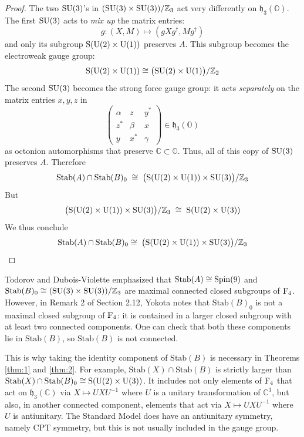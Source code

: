 \documentclass{article}
\theoremstyle{plain}
\theoremstyle{remark}
\theoremstyle{definition}
\newcommand{\maps}{\colon}    %
\newcommand{\C}{{\mathbb C}}  %
\newcommand{\Z}{{\mathbb Z}}  %
\renewcommand{\O}{{\mathbb O}}  %
\newcommand{\U}{{\rm U}}    %
\newcommand{\SU}{{\rm SU}}    %
\newcommand{\Spin}{{\rm Spin}}    %
\newcommand{\F}{{\rm F}}       %
\newcommand{\Stab}{\mathrm{Stab}} %
\renewcommand{\S}{\mathrm{S}} %
\newcommand{\h}{\mathfrak{h}}  %
\begin{document}
\begin{proof}
The two $\SU(3)$'s in  $(\SU(3) \times \SU(3))/\Z_3$ act very differently on $\h_3(\O)$.  The first $\SU(3)$ acts to \emph{mix up} the matrix entries:
\[    g \maps (X,M) \mapsto (gXg^\dagger, Mg^\dagger ) \]
and only its subgroup $\S(\U(2) \times \U(1))$ preserves $A$.  This subgroup becomes the electroweak gauge group:
\[   \S(\U(2) \times \U(1)) \cong \big(\SU(2) \times \U(1)\big)/\Z_2 \]
The second $\SU(3)$ becomes the strong force gauge group: it acts \emph{separately} on the matrix entries $x,y,z$ in  
\[    \left( \begin{array}{ccc}  
                         \alpha  &  z  & y^*    \\  
                         z^*       & \beta & x      \\ 
                         y       & x^*   & \gamma   
\end{array} \right) \in \h_3(\O) 
\]
as octonion automorphisms that preserve $\C \subset \O$.  Thus, all of this copy of $\SU(3)$ preserves $A$.  Therefore
\[   \Stab(A) \cap \Stab(B)_0  \; \cong \; \big(\S(\U(2) \times \U(1)) \times \SU(3)\big) /\Z_3  \]
But
\[     
  \big(\S(\U(2) \times \U(1)) \times \SU(3)\big) /\Z_3  \;\cong\; \S(\U(2) \times \U(3))  
\]
We thus conclude
\[   \Stab(A) \cap \Stab(B)_0 \cong \; \big(\S(\U(2) \times \U(1)) \times \SU(3)\big) /\Z_3   \qedhere \]
\end{proof}

Todorov and Dubois-Violette \cite{TDV} emphasized that $\Stab(A) \cong \Spin(9)$ and $\Stab(B)_0 \cong (\SU(3) \times \SU(3))/\Z_3$ are maximal connected closed subgroups of $\F_4$.  However, in Remark 2 of Section 2.12, Yokota \cite{Yokota} notes that $\Stab(B)_0$ is not a maximal closed subgroup of $\F_4$: it is contained in a larger closed subgroup with at least two connected components.  One can check that both these components lie in $\Stab(B)$, so $\Stab(B)$ is not connected.

This is why taking the identity component of $\Stab(B)$ is necessary in Theorems \ref{thm:1} and \ref{thm:2}.  For example, $\Stab(X) \cap \Stab(B)$ is strictly larger than $\Stab(X) \cap \Stab(B)_0 \cong \S(\U(2) \times \U(3))$.  It includes not only elements of $\F_4$ that act on $\h_3(\C)$ via $X \mapsto UXU^{-1}$ where $U$ is a unitary transformation of $\C^3$, but  also, in another connected component, elements that act via $X \mapsto UXU^{-1}$ where $U$ is antiunitary.  The Standard Model does have an antiunitary symmetry, namely CPT symmetry, but this is not usually included in the gauge group.
\end{document}
